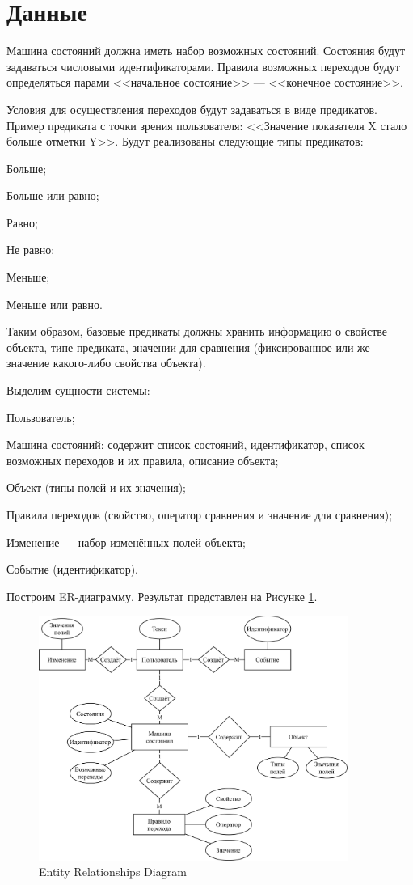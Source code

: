 \documentclass{hse_document}
\begin{document}
\section{Данные}

Машина состояний должна иметь набор возможных состояний.
Состояния будут задаваться числовыми идентификаторами.
Правила возможных переходов будут определяться парами <<начальное состояние>>
--- <<конечное состояние>>.

Условия для осуществления переходов будут задаваться в виде предикатов.
Пример предиката с точки зрения пользователя: <<Значение показателя X стало
больше отметки Y>>. Будут реализованы следующие типы предикатов:

\begin{compactitem}
\item Больше;
\item Больше или равно;
\item Равно;
\item Не равно;
\item Меньше;
\item Меньше или равно.
\end{compactitem}

Таким образом, базовые предикаты должны хранить информацию о свойстве объекта,
типе предиката, значении для сравнения (фиксированное или же значение
какого-либо свойства объекта).

Выделим сущности системы:
\begin{compactitem}
\item Пользователь;
\item Машина состояний: содержит список состояний, идентификатор, список
    возможных переходов и их правила, описание объекта;
\item Объект (типы полей и их значения);
\item Правила переходов (свойство, оператор сравнения и значение для сравнения);
\item Изменение --- набор изменённых полей объекта;
\item Событие (идентификатор).
\end{compactitem}

Построим ER-диаграмму. Результат представлен на Рисунке \ref{fig:erd}.

\begin{figure}[htpb]
    \centering
    \includegraphics[width=0.9\textwidth]{diagrams/erd.png}
    \caption{Entity Relationships Diagram}
    \label{fig:erd}
\end{figure}
\end{document}
